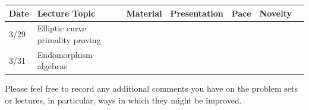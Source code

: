 \documentclass[11pt]{article}
\theoremstyle{definition}
\begin{document}
\begin{center}
\begin{tabular}{l|l|r|r|r|r|r}
Date & Lecture Topic & Material & Presentation & Pace & Novelty\\\hline
3/29 & Elliptic curve primality proving & & & & \\\hline 
3/31 & Endomorphism algebras & & & & \\\hline 
\end{tabular}
\end{center}

\noindent
Please feel free to record any additional comments you have on the problem sets or lectures, in particular, ways in which they might be improved.
\end{document}
